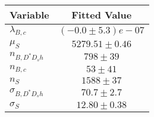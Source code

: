 \begin{tabular}[t]{lc}
\hline
Variable &Fitted Value\\
\hline\hline
$\lambda_{B,c}$&$(-0.0\pm5.3)e-07$\\
\hline
$\mu_S$&$5279.51\pm0.46$\\
\hline
$n_{B, D^* D_s h}$&$798\pm39$\\
\hline
$n_{B,c}$&$53\pm41$\\
\hline
$n_S$&$1588\pm37$\\
\hline
$\sigma_{B, D^* D_s h}$&$70.7\pm2.7$\\
\hline
$\sigma_S$&$12.80\pm0.38$\\
\hline
\end{tabular}